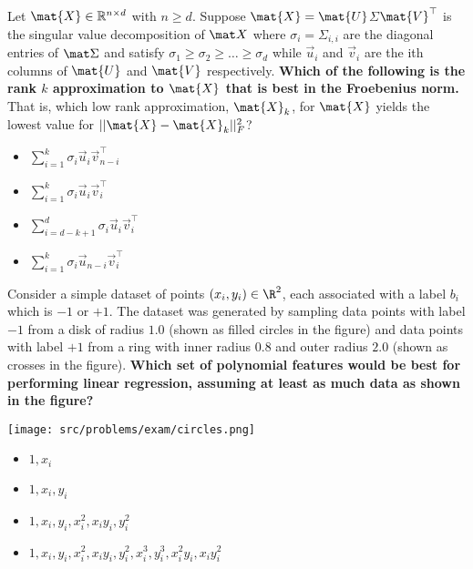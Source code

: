\documentclass[preview]{standalone}
\begin{document}
\begin{Parts}

	\Part Let $\mat{X} \in \mathbb{R}^{n \times d} $ with $n \geq
        d$. Suppose $\mat{X} =
        \mat{U}${\boldmath$\Sigma$}$\mat{V}^\top$ is the singular
        value decomposition of $\mat X$ where $\sigma_i =
        \Sigma_{i,i}$ are the diagonal entries of $\mat \Sigma$ and
        satisfy $\sigma_1 \geq \sigma_2\geq \dots \geq \sigma_d$ while
        $\vec{u}_i$ and $\vec{v}_i$ are the ith columns of $\mat{U}$
        and $\mat{V}$ respectively.  {\bf Which of the following is
          the rank $k$ approximation to $\mat{X}$ that is best in the Froebenius norm.} That is, which low rank approximation, $\mat{X}_k$, for $\mat{X}$ yields the lowest value for $\lvert\lvert\mat{X}-\mat{X}_k\rvert\rvert^2_F$?

	\begin{multicols}{4}
               \begin{itemize}
                        \item[\mcqb] $\sum_{i=1}^k \sigma_i \vec{u}_i \vec{v}_{n-i}^\top$
			\item[\mcqb] $\sum_{i=1}^k \sigma_i \vec{u}_i \vec{v}_{i}^\top$
			\item[\mcqb] $\sum_{i=d-k+1}^d \sigma_i \vec{u}_i \vec{v}_{i}^\top$
			\item[\mcqb] $\sum_{i=1}^k \sigma_i \vec{u}_{n-i} \vec{v}_{i}^\top$
		\end{itemize}
	\end{multicols}

	









	\Part Consider a simple dataset of points $(x_i, y_i) \in \R^2$, each
	associated with a label $b_i$ which is $-1$ or $+1$. The dataset was generated by sampling data points with label $-1$ from a disk of radius $1.0$ (shown as filled circles in the figure) and data points with label $+1$ from a ring with inner radius $0.8$ and outer radius $2.0$ (shown as crosses in the figure). {\bf Which set of polynomial features would be best for performing linear regression, assuming at
least as much data as shown in the figure?}
\begin{center}
	\texttt{[image: src/problems/exam/circles.png]}
      \end{center}
      \begin{multicols}{2}
		\begin{itemize}
			\item[\mcqb] $1, x_i$
			\item[\mcqb] $1, x_i, y_i$
			\item[\mcqb] $1, x_i, y_i, x_i^2, x_iy_i, y_i^2$
			\item[\mcqb] $1, x_i, y_i, x_i^2, x_iy_i, y_i^2, x_i^3, y_i^3, x_i^2y_i, x_iy_i^2$
		\end{itemize}
	\end{multicols}


\end{Parts}
\end{document}
